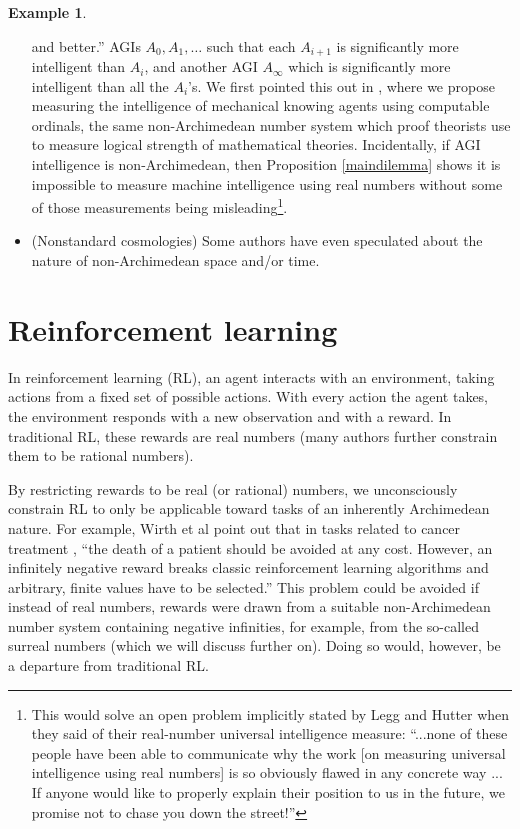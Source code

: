 \documentclass[reqno]{article}
\theoremstyle{definition}
\newtheorem{example}[theorem]{Example}
\begin{document}
\begin{example}
\begin{itemize}
{        and better.'' \cite{protagoras}} AGIs $A_0,A_1,\ldots$ such that
        each $A_{i+1}$ is significantly more
        intelligent than $A_i$, and another AGI $A_\infty$ which is significantly more
        intelligent than all the $A_i$'s. We first pointed this out in
        \cite{alexander2019measuring}, where we propose measuring the
        intelligence of mechanical
        knowing agents using computable ordinals, the same non-Archimedean number system
        which proof theorists use to measure logical strength of mathematical
        theories. Incidentally, if AGI intelligence is non-Archimedean, then
        Proposition \ref{maindilemma} shows it is
        impossible to measure machine intelligence using real numbers without some
        of those measurements being misleading\footnote{This would solve an open problem
        implicitly stated by Legg and Hutter \cite{legg} when they said of their
        real-number universal intelligence measure: ``...none of these people have
        been able to communicate why the work [on measuring universal intelligence
        using real numbers] is so obviously flawed in any concrete way ...
        If anyone would like to properly explain their position to us in the future,
        we promise not to chase you down the street!''}.
        \item
        (Nonstandard cosmologies)
        Some
        authors
        \cite{al2016surreal} \cite{andreka2012logic}
        \cite{reeder2012infinitesimals} \cite{rosinger2007cosmic}
        \cite{chen2019infinitesimal} have
        even speculated about the nature of non-Archimedean space and/or
        time.
    \end{itemize}
\end{example}


\section{Reinforcement learning}
\label{reinforcementlearningsection}

In reinforcement learning (RL), an agent interacts with an environment,
taking actions from a fixed set of possible actions. With every action the
agent takes, the environment responds with a new observation and with a
reward. In traditional RL, these rewards are real numbers (many
authors further constrain them to be rational numbers).

By restricting rewards to be real (or rational) numbers, we unconsciously
constrain RL to only be applicable toward tasks of an inherently Archimedean
nature. For example, Wirth et al point out \cite{wirth2017survey} that
in tasks related to cancer treatment \cite{zhao2009reinforcement},
``the death of a patient should be avoided at any cost. However, an
infinitely negative reward breaks classic reinforcement learning algorithms
and arbitrary, finite values have to be selected.'' This problem could be
avoided if instead of real numbers, rewards were drawn from a suitable
non-Archimedean number system containing negative infinities,
for example, from the so-called
surreal numbers (which we will discuss further on). Doing so would, however,
be a departure from traditional RL.
\end{document}
